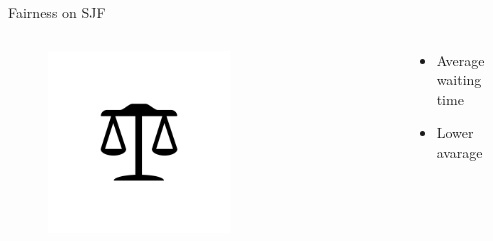 \documentclass[10pt, compress, aspectratio=169]{beamer}
\begin{document}
\begin{frame}{Fairness on SJF}

  \begin{columns}[T]
    \begin{column}{.5\textwidth}
      \begin{figure}[ht]
        \centering
        \includegraphics[width=0.6\textwidth, keepaspectratio=true]{images/fairness.png}
      \end{figure}
    \end{column}

    \hfill
    \begin{column}{.5\textwidth}
      \begin{itemize}
        \item Average waiting time
        \item Lower avarage
      \end{itemize}
    \end{column}
  \end{columns}

\end{frame}

\end{document}
